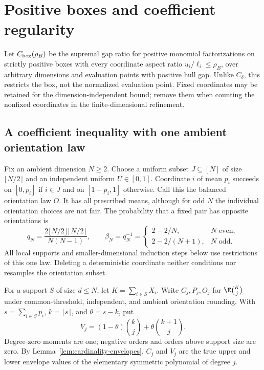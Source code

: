 \section{Positive boxes and coefficient regularity}\label{sec:positive-boxes}
Let $C_{\rm box}(\rho_B)$ be the supremal gap ratio for positive monomial
factorizations on strictly positive boxes with every coordinate aspect
ratio $u_i/\ell_i\le\rho_B$, over arbitrary dimensions and evaluation
points with positive hull gap. Unlike $C_\delta$, this restricts the box,
not the normalized evaluation point. Fixed coordinates may be retained for
the dimension-independent bound; remove them when counting the nonfixed
coordinates in the finite-dimensional refinement.

\subsection{A coefficient inequality with one ambient orientation law}
Fix an ambient dimension $N\ge2$. Choose a uniform subset $J\subseteq[N]$
of size $\lfloor N/2\rfloor$ and an independent uniform $U\in[0,1]$.
Coordinate $i$ of mean $p_i$ succeeds on $[0,p_i]$ if $i\in J$ and on
$[1-p_i,1]$ otherwise. Call this the balanced orientation law $O$. It has
all prescribed means, although for odd $N$ the individual orientation
choices are not fair. The probability that a fixed pair has opposite
orientations is
\[
 q_N=\frac{2\lfloor N/2\rfloor\lceil N/2\rceil}{N(N-1)},\qquad
 \beta_N=q_N^{-1}=
 \begin{cases}2-2/N,&N\text{ even},\\2-2/(N+1),&N\text{ odd}.
 \end{cases}
\]
All local supports and smaller-dimensional induction steps below use
restrictions of this one law. Deleting a deterministic coordinate
neither conditions nor resamples the orientation subset.

For a support $S$ of size $d\le N$, let $K=\sum_{i\in S}X_i$.
Write $C_j,P_j,O_j$ for $\E\binom Kj$ under common-threshold,
independent, and ambient orientation rounding. With
$s=\sum_{i\in S}p_i$, $k=\lfloor s\rfloor$, and $\theta=s-k$, put
\[
 V_j=(1-\theta)\binom kj+\theta\binom{k+1}j.
\]
Degree-zero moments are one; negative orders and orders above support
size are zero. By Lemma~\ref{lem:cardinality-envelopes}, $C_j$ and $V_j$
are the true upper and lower envelope values of the elementary
symmetric polynomial of degree $j$.

